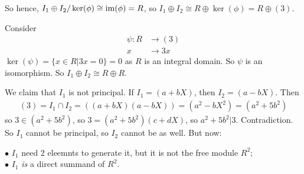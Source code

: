 \documentclass[a4paper]{article}
\begin{document}
\begin{eg}
So hence, $I_1 \oplus I_2 / \ker(\phi) \cong \operatorname{im}(\phi)=R$, so $I_1 \oplus I_2 \cong R \oplus \ker(\phi) = R \oplus (3)$.

Consider
\begin{equation*}
\begin{aligned}
\psi: R &\to (3)\\
x &\to 3x
\end{aligned}
\end{equation*}
$\ker(\psi) = \{x \in R|3x=0\} = 0$ as $R$ is an integral domain. So $\psi$ is an isomorphism. So $I_1 \oplus I_2 \cong R \oplus R$.

We claim that $I_1$ is not principal. If $I_1 = (a+bX)$, then $I_2 = (a-bX)$. Then
\begin{equation*}
\begin{aligned}
(3) = I_1 \cap I_2 = ((a+bX)(a-bX)) = (a^2-bX^2) = (a^2+5b^2)
\end{aligned}
\end{equation*}
so $3 \in (a^2+5b^2)$, so $3=(a^2+5b^2)(c+dX)$, so $a^2 + 5b^2 |3$. Contradiction. So $I_1$ cannot be principal, so $I_2$ cannot be as well. But now:

$\bullet$ $I_1$ need 2 eleemnts to generate it, but it is not the free module $R^2$;\\
$\bullet$ $I_1$ \emph{is} a direct summand of $R^2$.

\end{eg}
\end{document}
